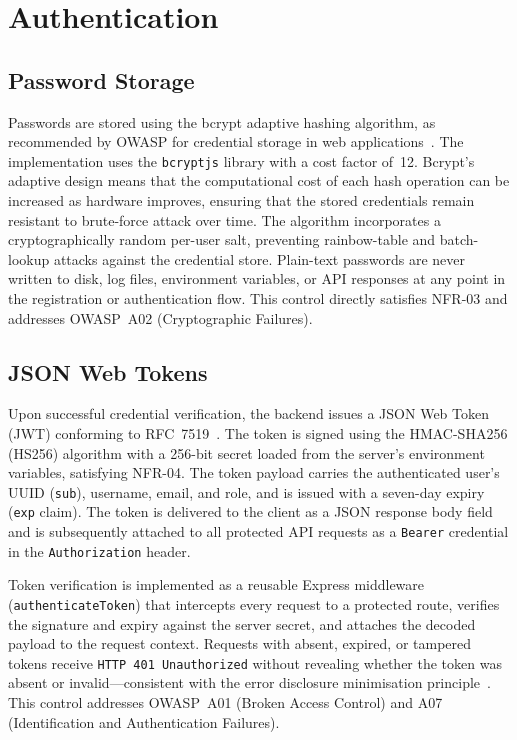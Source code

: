 \section{Authentication}
\label{sec:auth}

\subsection{Password Storage}

Passwords are stored using the bcrypt adaptive hashing algorithm, as
recommended by OWASP for credential storage in web
applications~\cite{owasp2021}. The implementation uses the
\texttt{bcryptjs} library with a cost factor of~12. Bcrypt's adaptive
design means that the computational cost of each hash operation can be
increased as hardware improves, ensuring that the stored credentials remain
resistant to brute-force attack over time. The algorithm incorporates a
cryptographically random per-user salt, preventing rainbow-table and
batch-lookup attacks against the credential store. Plain-text passwords are
never written to disk, log files, environment variables, or API responses
at any point in the registration or authentication flow. This control
directly satisfies NFR-03 and addresses OWASP~A02 (Cryptographic Failures).

\subsection{JSON Web Tokens}

Upon successful credential verification, the backend issues a JSON Web Token
(JWT) conforming to RFC~7519~\cite{jwt2015}. The token is signed using the
HMAC-SHA256 (HS256) algorithm with a 256-bit secret loaded from the server's
environment variables, satisfying NFR-04. The token payload carries the
authenticated user's UUID (\texttt{sub}), username, email, and role, and is
issued with a seven-day expiry (\texttt{exp} claim). The token is delivered
to the client as a JSON response body field and is subsequently attached to
all protected API requests as a \texttt{Bearer} credential in the
\texttt{Authorization} header.

Token verification is implemented as a reusable Express middleware
(\texttt{authenticateToken}) that intercepts every request to a protected
route, verifies the signature and expiry against the server secret, and
attaches the decoded payload to the request context. Requests with absent,
expired, or tampered tokens receive \texttt{HTTP~401 Unauthorized} without
revealing whether the token was absent or invalid---consistent with the
error disclosure minimisation principle~\cite{owasp2021}. This control
addresses OWASP~A01 (Broken Access Control) and A07 (Identification and
Authentication Failures).

